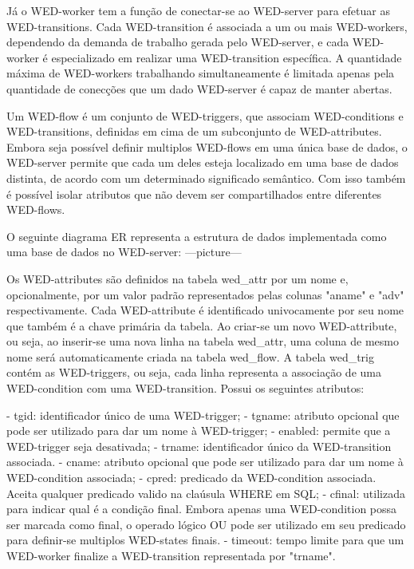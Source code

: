   Já o WED-worker tem a função de conectar-se ao WED-server para efetuar as WED-transitions. Cada WED-transition é associada
a um ou mais WED-workers, dependendo da demanda de trabalho gerada pelo WED-server, e cada WED-worker é especializado
em realizar uma WED-transition específica. A quantidade máxima de WED-workers trabalhando simultaneamente é limitada
apenas pela quantidade de conecções que um dado WED-server é capaz de manter abertas.
  
  Um WED-flow é um conjunto de WED-triggers, que associam WED-conditions e WED-transitions, definidas em cima de 
um subconjunto de WED-attributes.
  Embora seja possível definir multiplos WED-flows em uma única base de dados, o WED-server permite que cada um deles 
esteja localizado em uma base de dados distinta, de acordo com um determinado significado semântico. Com isso também é 
possível isolar atributos que não devem ser compartilhados entre diferentes WED-flows. 
  
  O seguinte diagrama ER representa a estrutura de dados implementada como uma base de dados no WED-server:
  ---picture---

  Os WED-attributes são definidos na tabela wed_attr por um nome e, opcionalmente, por um valor padrão representados 
pelas colunas "aname" e "adv" respectivamente. Cada WED-attribute é identificado univocamente por seu nome que também é 
a chave primária da tabela. Ao criar-se um novo WED-attribute, ou seja, ao inserir-se uma nova linha na tabela wed_attr, 
uma coluna de mesmo nome será automaticamente criada na tabela wed_flow.
  A tabela wed_trig contém as WED-triggers, ou seja, cada linha representa a associação de uma WED-condition com uma 
WED-transition. Possui os seguintes atributos:

  - tgid: identificador único de uma WED-trigger;
  - tgname: atributo opcional que pode ser utilizado para dar um nome à WED-trigger;
  - enabled: permite que a WED-trigger seja desativada;
  - trname: identificador único da WED-transition associada.
  - cname: atributo opcional que pode ser utilizado para dar um nome à WED-condition associada;
  - cpred: predicado da WED-condition associada. Aceita qualquer predicado valido na claúsula WHERE em SQL;
  - cfinal: utilizada para indicar qual é a condição final. Embora apenas uma WED-condition possa ser marcada como final,
           o operado lógico OU pode ser utilizado em seu predicado para definir-se multiplos WED-states finais.
  - timeout: tempo limite para que um WED-worker finalize a WED-transition representada por "trname".

